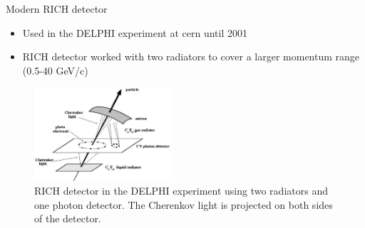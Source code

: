 \documentclass[aspectratio=1610, 10pt]{beamer}
\begin{document}

\begin{frame}{Modern RICH detector}
  \begin{itemize}
    \item Used in the DELPHI experiment at cern until 2001
    \medskip
    \item RICH detector worked with two radiators to cover a larger momentum range (0.5-40 GeV/c)
  \end{itemize}
  \begin{figure}
    \includegraphics[width=0.45\textwidth]{images/rich_delphi.png}
    \caption{RICH detector in the DELPHI experiment using two radiators and one photon detector. The Cherenkov light is projected on both
    sides of the detector.}
  \end{figure}
\end{frame}
\end{document}
